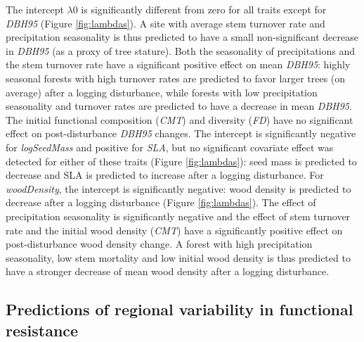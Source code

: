 \documentclass[]{elsarticle} %
\begin{document}
The intercept \(\lambda0\) is significantly different from zero for all
traits except for \emph{DBH95} (Figure \ref{fig:lambdas}). A site with
average stem turnover rate and precipitation seasonality is thus
predicted to have a small non-significant decrease in \emph{DBH95} (as a
proxy of tree stature). Both the seasonality of precipitations and the
stem turnover rate have a significant positive effect on mean
\emph{DBH95}: highly seasonal forests with high turnover rates are
predicted to favor larger trees (on average) after a logging
disturbance, while forests with low precipitation seasonality and
turnover rates are predicted to have a decrease in mean \emph{DBH95}.
The initial functional composition (\emph{CMT}) and diversity
(\emph{FD}) have no significant effect on post-disturbance \emph{DBH95}
changes. The intercept is significantly negative for \emph{logSeedMass}
and positive for \emph{SLA}, but no significant covariate effect was
detected for either of these traits (Figure \ref{fig:lambdas}): seed
mass is predicted to decrease and SLA is predicted to increase after a
logging disturbance. For \emph{woodDensity}, the intercept is
significantly negative: wood density is predicted to decrease after a
logging disturbance (Figure \ref{fig:lambdas}). The effect of
precipitation seasonality is significantly negative and the effect of
stem turnover rate and the initial wood density (\emph{CMT}) have a
significantly positive effect on post-disturbance wood density change. A
forest with high precipitation seasonality, low stem mortality and low
initial wood density is thus predicted to have a stronger decrease of
mean wood density after a logging disturbance.

\subsection{Predictions of regional variability in functional
resistance}\label{predictions-of-regional-variability-in-functional-resistance}
\end{document}

